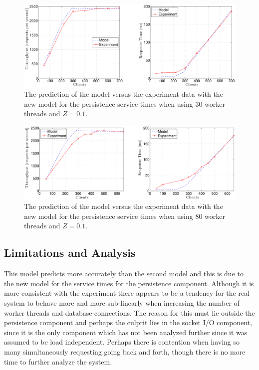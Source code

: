 \documentclass[a4paper, 11pt]{article}
\begin{document}
	\begin{figure}[cht!]
		\centering
			\includegraphics[width=1\linewidth,keepaspectratio]{thirdRealAndModel30Th}
		\caption{The prediction of the model versus the experiment data with the new model for the persistence service times when using 30 worker threads and $Z = 0.1$.}
		\label{fig:thirdRealAndModel30Th}
	\end{figure}

	\begin{figure}[cht!]
		\centering
			\includegraphics[width=1\linewidth,keepaspectratio]{thirdRealAndModel80Th}
		\caption{The prediction of the model versus the experiment data with the new model for the persistence service times when using 80 worker threads and $Z = 0.1$.}
		\label{fig:thirdRealAndModel80Th}
	\end{figure}
	\FloatBarrier


	\subsection{Limitations and Analysis}
	This model predicts more accurately than the second model and this is due to the new model for the service times for the persistence component. Although it is more consistent with the experiment there appears to be a tendency for the real system to behave more and more sub-linearly when increasing the number of worker threads and database-connections. The reason for this must lie outside the persistence component and perhaps the culprit lies in the socket I/O component, since it is the only component which has not been analyzed further since it was assumed to be load independent. Perhaps there is contention when having so many simultaneously requesting going back and forth, though there is no more time to further analyze the system.
\end{document}
